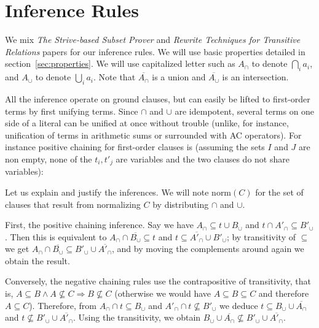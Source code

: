 \documentclass{article}
\newcommand{\compl}[1]{\ensuremath{\overline{#1}}}
\newcommand{\normalize}[1]{\ensuremath{\text{norm}(#1)}}
\begin{document}

\section{Inference Rules}
We mix \emph{The Strive-based Subset Prover} and
\emph{Rewrite Techniques for Transitive Relations} papers for our
inference rules.
We will use basic properties detailed in section~\ref{sec:properties}.
We will use capitalized
letter such as $A_\cap$ to denote $\bigcap_i a_i$, and $A_\cup$ to denote
$\bigcup_i a_i$. Note that $\compl{A_\cap}$ is a union and
$\compl{A_\cup}$ is an intersection.

All the inference operate on ground clauses, but can easily be lifted to
first-order terms by first unifying terms. Since $\cap$ and $\cup$ are
idempotent, several terms on one side of a literal can be unified at once
without trouble (unlike, for instance, unification of terms in arithmetic
sums or surrounded with AC operators). For instance positive chaining
for first-order clauses is (assuming the sets $I$ and $J$ are non empty,
none of the $t_i, t'_j$ are variables
and the two clauses do not share variables):

\begin{prooftree}
\end{prooftree}

Let us explain and justify the inferences. We will note $\normalize{C}$ for
the set of clauses that result from normalizing $C$ by distributing $\cap$
and $\cup$.

First, the positive chaining inference. Say we have $A_\cap \subseteq t\cup B_\cup$
and $t \cap A'_\cap \subseteq B'_\cup$. Then this is equivalent
to $A_\cap \cap \compl{B_\cup} \subseteq t$ and
$t \subseteq \compl{A'_\cap}\cup B'_\cup$; by transitivity of
$\subseteq$ we get
$A_\cap \cap \compl{B_\cup} \subseteq B'_\cup \cup \compl{A'_\cap}$, and by moving
the complements around again we obtain the result.

Conversely, the negative chaining rules use the contrapositive of transitivity,
that is, $A \subseteq B \land A \not\subseteq C \Rightarrow B \not\subseteq C$
(otherwise we would have $A \subseteq B \subseteq C$ and therefore $A \subseteq
C$).
Therefore, from $A_\cap \cap t \subseteq B_\cup$ and
$A'_\cap \cap t \not\subseteq B'_\cup$ we deduce
$t \subseteq B_\cup \cup \compl{A_\cap}$ and
$t \not\subseteq B'_\cup \cup \compl{A'_\cap}$. Using the transitivity,
we obtain $B_\cup \cup \compl{A_\cap} \not\subseteq B'_\cup \cup \compl{A'_\cap}$.
\end{document}
